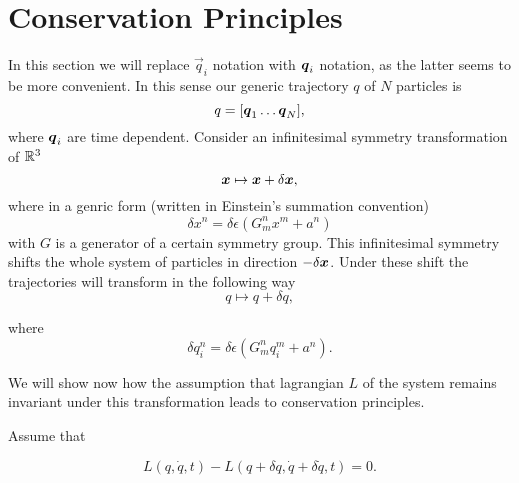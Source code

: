 \documentclass[main.tex]{subfiles}
\begin{document}
\section{Conservation Principles}
In this section we will replace $\vec{q}_i$ notation with $\boldsymbol{q}_i$ notation, as the latter seems to be more convenient. In this sense our generic trajectory $q$ of $N$ particles is 
\begin{equation}
q = [\boldsymbol{q}_1 \dots \boldsymbol{q}_N],
\end{equation}
where $\boldsymbol{q}_i$ are time dependent.
Consider an infinitesimal symmetry transformation of $\mathbb{R}^3$
\begin{equation}
\boldsymbol{x} \mapsto \boldsymbol{x} + \delta\boldsymbol{x},
\end{equation}
where in a genric form (written in Einstein's summation convention)
\begin{equation}
\delta x^n = \delta\epsilon(G^n_m x^m + a^n)
\end{equation}
with $G$ is a generator of a certain symmetry group.
This infinitesimal symmetry shifts the whole system of particles in direction $-\delta \boldsymbol{x}$.
Under these shift the trajectories will transform in the following way
\begin{equation}
q \mapsto q + \delta q,
\end{equation} 

where 
\begin{equation}
\delta q^n_i = \delta\epsilon(G^n_m q^m_i + a^n).
\end{equation}

We will show now how the assumption that lagrangian $L$ of the system remains invariant under this transformation leads to conservation principles.

Assume that 

\begin{equation}
L(q, \dot{q}, t) - L(q + \delta q, \dot{q} + \delta \dot{q}, t) = 0.
\end{equation}
\end{document}
